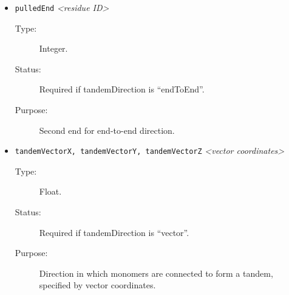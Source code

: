 \documentclass[a4paper]{article}
\begin{document}
\begin{itemize}
\item \texttt{pulledEnd} \textit{\textless residue ID\textgreater}
\begin{description}
\item[Type:] Integer.
\item[Status:] Required if tandemDirection is ``endToEnd''.
\item[Purpose:] Second end for end-to-end direction.
\end{description}


\item \texttt{tandemVectorX, tandemVectorY, tandemVectorZ} \textit{\textless vector coordinates\textgreater}
\begin{description}
\item[Type:] Float.
\item[Status:] Required if tandemDirection is ``vector''.
\item[Purpose:] Direction in which monomers are connected to form a tandem, specified by vector coordinates.
\end{description}


\end{itemize}
\end{document}
